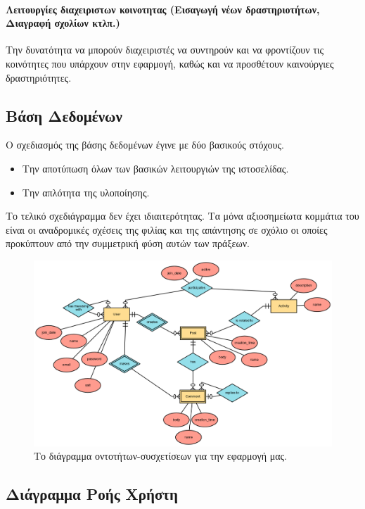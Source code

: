 \documentclass[nonacm, language=english, language=greek]{acmart}
\begin{document}
\paragraph{Λειτουργίες διαχειριστων κοινοτητας (Εισαγωγή νέων δραστηριοτήτων, Διαγραφή σχολίων κτλπ.)}
Την δυνατότητα να μπορούν διαχειριστές να συντηρούν και να φροντίζουν τις
κοινότητες που υπάρχουν στην εφαρμογή, καθώς και να προσθέτουν καινούργιες
δραστηριότητες.

\subsection{Βάση Δεδομένων}

Ο σχεδιασμός της βάσης δεδομένων έγινε με δύο βασικούς στόχους. 

\begin{itemize}
    \item Την αποτύπωση όλων των βασικών λειτουργιών της ιστοσελίδας.
    \item Την απλότητα της υλοποίησης.
\end{itemize}

Το τελικό σχεδιάγραμμα δεν έχει ιδιαιτερότητας. Τα μόνα 
αξιοσημείωτα κομμάτια του είναι οι αναδρομικές σχέσεις 
της φιλίας και της απάντησης σε σχόλιο οι οποίες προκύπτουν 
από την συμμετρική φύση αυτών των πράξεων.

\begin{figure}[htpb]
    \centering
    \includegraphics[width=\textwidth]{./assets/erd.png}
    \caption{Το διάγραμμα οντοτήτων-συσχετίσεων για την εφαρμογή μας.}
    \label{fig:}
\end{figure}

\subsection{Διάγραμμα Ροής Χρήστη}
\end{document}
